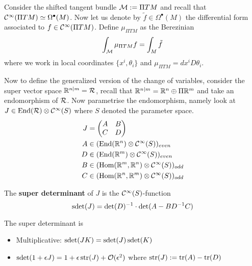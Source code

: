 \begin{rem}
  \begin{example}
    Consider the shifted tangent bundle $\mathcal{M} := \Pi TM$ and recall that $\mathcal{C}^{\infty}(\Pi TM) \simeq \Omega^\bullet(M)$. Now let us denote by $\tilde{f} \in \Omega^\bullet(M)$ the differential form associated to $f \in \mathcal{C}^{\infty}(\Pi TM)$. Define $\mu_{\Pi TM}$ as the Berezinian
    \begin{equation}\int_{\mathcal{M}} \mu_{\Pi TM} f = \int_M \tilde{f} \end{equation}
    where we work in local coordinates $\{x^i, \theta_i\}$ and $\mu_{\Pi TM} = dx^i D\theta_i$.
  \end{example}

  Now to define the generalized version of the change of variables, consider the super vector space $\mathbb{R}^{n|m} = \mathcal{R}$, recall that $\mathbb{R}^{n|m} = \mathbb{R}^n \oplus \Pi \mathbb{R}^m$ and take an endomorphism of $\mathcal{R}$. Now parametrise the endomorphism, namely look at $J \in \operatorname{End}(\mathcal{R}) \otimes \mathcal{C}^{\infty}(S)$ where $S$ denoted the parameter space.
  \begingroup
    \allowdisplaybreaks
    \begin{align}
    J &=
    \begin{pmatrix}
      A & B \\
      C & D
    \end{pmatrix} \\
    A &\in (\operatorname{End}(\mathbb{R}^n) \otimes \mathcal{C}^{\infty}(S))_{even} \\
    D &\in (\operatorname{End}(\mathbb{R}^m) \otimes \mathcal{C}^{\infty}(S))_{even} \\
    B &\in (\operatorname{Hom}(\mathbb{R}^m, \mathbb{R}^n) \otimes \mathcal{C}^{\infty}(S))_{odd} \\
    C &\in (\operatorname{Hom}(\mathbb{R}^n, \mathbb{R}^m) \otimes \mathcal{C}^{\infty}(S))_{odd}
    \end{align}
  \endgroup

  \begin{definition}
    The \textbf{super determinant} of $J$ is the $\mathcal{C}^{\infty}(S)$-function
    \begin{equation}\operatorname{sdet}(J) = \det(D)^{-1} \cdot \det(A-BD^{-1} C) \end{equation}
  \end{definition}

  \begin{lem}
    The super determinant is
    \begin{itemize}
      \item Multiplicative: $\operatorname{sdet}(JK) = \operatorname{sdet}(J) \operatorname{sdet}(K)$
      \item $\sdet(1 + \epsilon J) = 1 + \epsilon \str(J)+ \OO(\epsilon^2)$ where $\operatorname{str}(J) := \operatorname{tr}(A) - \operatorname{tr}(D)$
    \end{itemize}
  \end{lem}


\end{rem}
